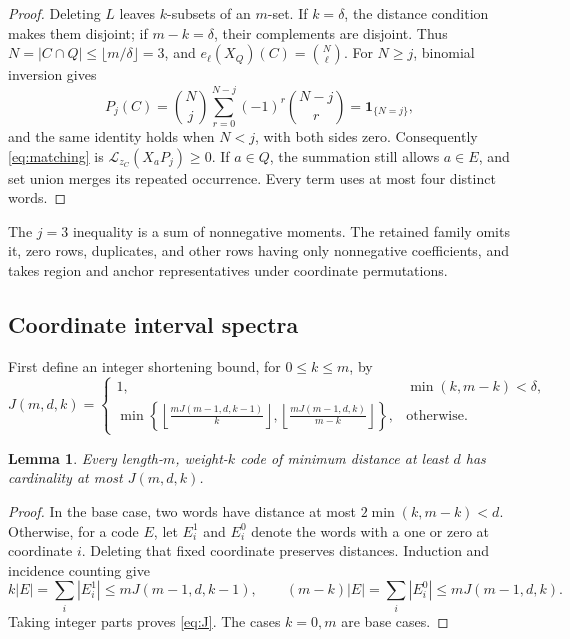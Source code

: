 \documentclass[11pt]{article}
\newtheorem{lemma}{Lemma}
\newcommand{\Lzc}{\mathcal L_{z_C}}
\newcommand{\ind}{\mathbf 1}
\begin{document}
\begin{proof}
Deleting $L$ leaves $k$-subsets of an $m$-set. If $k=\delta$, the distance
condition makes them disjoint; if $m-k=\delta$, their complements are
disjoint. Thus $N=|C\cap Q|\le\lfloor m/\delta\rfloor=3$, and
$e_\ell(X_Q)(C)=\binom N\ell$. For $N\ge j$, binomial inversion gives
\[
 P_j(C)=\binom Nj\sum_{r=0}^{N-j}(-1)^r\binom{N-j}r
       =\ind_{\{N=j\}},
\]
and the same identity holds when $N<j$, with both sides zero.
Consequently \eqref{eq:matching} is $\Lzc(X_aP_j)\ge0$.
If $a\in Q$, the summation still allows $a\in E$, and set union merges its
repeated occurrence. Every term uses at most four distinct words.
\end{proof}

The $j=3$ inequality is a sum of nonnegative moments. The retained family
omits it, zero rows, duplicates, and other rows having only nonnegative
coefficients, and takes region and anchor representatives under coordinate
permutations.

\subsection{Coordinate interval spectra}\label{subsec:spectra}

First define an integer shortening bound, for $0\le k\le m$, by
\begin{equation}\label{eq:J}
 J(m,d,k)=
 \begin{cases}
 1,&\min(k,m-k)<\delta,\\[2pt]
 \displaystyle\min\left\{
 \left\lfloor\frac{mJ(m-1,d,k-1)}k\right\rfloor,
 \left\lfloor\frac{mJ(m-1,d,k)}{m-k}\right\rfloor\right\},&\text{otherwise}.
 \end{cases}
\end{equation}

\begin{lemma}\label{lem:capacity}
Every length-$m$, weight-$k$ code of minimum distance at least $d$ has
cardinality at most $J(m,d,k)$.
\end{lemma}
\begin{proof}
In the base case, two words have distance at most
$2\min(k,m-k)<d$. Otherwise, for a code $E$, let $E_i^1$ and $E_i^0$ denote
the words with a one or zero at coordinate $i$. Deleting that fixed
coordinate preserves distances. Induction and incidence counting give
\[
 k|E|=\sum_i|E_i^1|\le mJ(m-1,d,k-1),\qquad
 (m-k)|E|=\sum_i|E_i^0|\le mJ(m-1,d,k).
\]
Taking integer parts proves \eqref{eq:J}. The cases $k=0,m$ are base cases.
\end{proof}
\end{document}
